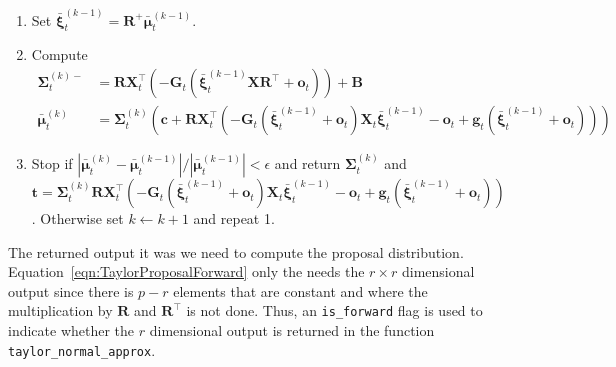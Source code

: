 \documentclass[notitlepage]{article}
\renewcommand{\vec}[1]{\bm{#1}}
\newcommand{\vecb}[1]{\bar{\vec{#1}}}
\newcommand{\mat}[1]{\mathbf{#1}}
\newcommand{\Lparen}[1]{\left( #1\right)}
\newcommand{\Lvert}[1]{\left\vert #1\right\vert}
\newcommand{\dimState}{p}
\newcommand{\dimRng}{r}
\begin{document}
\begin{enumerate}
  \item Set $\vecb{\xi}_t^{(k - 1)} = \mat{R}^+ \vecb{\mu}_t^{(k - 1)}$. 
  \item Compute %
  {\scriptsize \begin{align*}
  		\mat{\Sigma}_t^{(k)-} &= 
  		\mat{R}\mat{X}_t^\top\Lparen{-\mat{G}_t\Lparen{
  			\vecb{\xi}_t^{(k-1)}\mat{X}\mat{R}^\top + \vec{o}_t}
  		} + \mat{B}  \\
%
	\vecb{\mu}_t^{(k)}
	&= \mat{\Sigma}_t^{(k)}\Lparen{
		\vec{c} +
		\mat{R}\mat{X}_t^\top
		\Lparen{
			-\mat{G}_t\Lparen{\vecb{\xi}_t^{(k -1)} + \vec{o}_t}
			\mat{X}_t\vecb{\xi}_t^{(k - 1)} - \vec{o}_t +
			\vec{g}_t\Lparen{\vecb{\xi}_t^{(k -1)} + \vec{o}_t}
		}
	}
  \end{align*}
  }
  \item Stop if $\Lvert{\vecb{\mu}_t^{(k)} - \vecb{\mu}_t^{(k - 1)}} / \Lvert{\vecb{\mu}_t^{(k - 1)}} < \epsilon$ and return $\mat{\Sigma}_t^{(k)}$ and \\%
$\vec{t} = \mat{\Sigma}_t^{(k)}\mat{R}\mat{X}_t^\top
		\Lparen{
			-\mat{G}_t\Lparen{\vecb{\xi}_t^{(k -1)} + \vec{o}_t}
			\mat{X}_t\vecb{\xi}_t^{(k -1)} - \vec{o}_t +
			\vec{g}_t\Lparen{\vecb{\xi}_t^{(k -1)} + \vec{o}_t}
		}$%
. Otherwise set $k \leftarrow k + 1$ and repeat 1. 
\end{enumerate}

The returned output it was we need to compute the proposal distribution. Equation~\eqref{eqn:TaylorProposalForward} only the needs the $\dimRng\times\dimRng$ dimensional output since there is $\dimState - \dimRng$ elements that are constant and where the multiplication by $\mat{R}$ and $\mat{R}^\top$ is not done. Thus, an \texttt{is\_forward} flag is used to indicate whether the $\dimRng$ dimensional output is returned in the function \texttt{taylor\_normal\_approx}.





\newpage


\end{document}
